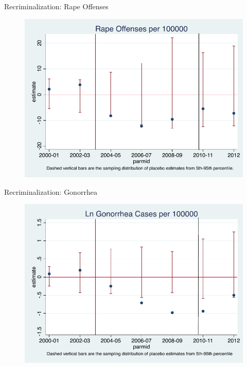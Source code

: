 \documentclass{beamer}
\begin{document}
\begin{frame}[shrink=20]{Recriminalization: Rape Offenses}
	\begin{figure}
	\includegraphics[scale=1]{./lecture_includes/eclplot_2012_rape_2.pdf}
	\end{figure}
\end{frame}

\begin{frame}[shrink=20]{Recriminalization: Gonorrhea}
	\begin{figure}
	\includegraphics[scale=1]{./lecture_includes/eclplot_2012_lngon_2}
	\end{figure}
\end{frame}
\end{document}
